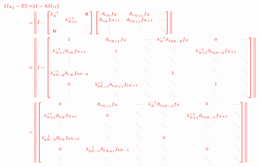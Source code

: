 \documentclass[11pt,a4paper,titlepage]{jsreport}
\theoremstyle{definition}
\providecommand{\DIFdel}[1]{{\protect\color{red} \scriptsize #1}} %
\begin{document}
\begin{enumerate}
\begin{displaymath}
  \DIFdel{\scriptsize
  \begin{split}
    \|I_{X_2} - E \| =& \| I - \Lambda M_{11}\| \\
    =& \left\| I -
    \begin{bmatrix}
      \lambda^{-1}_N & & \mathbf{0} \\
      & \lambda^{-1}_{N+1} &\\
      \mathbf{0} &  & \ddots
    \end{bmatrix}
    \begin{bmatrix}
      \partial_{a_{N}} f_{N} & \partial_{a_{N+1}} f_{N}  & \cdots \\
      \partial_{a_{N}} f_{N+1} & \partial_{a_{N+1}} f_{N+1}  & \cdots \\
      \vdots & \vdots & \ddots \\
    \end{bmatrix}
    \right\|\\
    =& \left \|
    I - \begin{bmatrix}
      1 & \partial_{a_{N+1}} f_{N}  & \cdots & \lambda^{-1}_{N}\partial_{a_{3N-2}}f_N & 0 & \cdots \\
      \lambda^{-1}_{N+1}\partial_{a_{N}} f_{N+1} & 1  & \ddots & \ddots & \lambda^{-1}_{N+1}\partial_{a_{3N-3}}f_{N+1} & \ddots \\
      \vdots & \ddots & \ddots & \ddots & \ddots & \ddots \\
      \lambda^{-1}_{3N-2}\partial_{a_{N}} f_{3N-2} & \ddots & \ddots & 1 & \ddots & \ddots\\
      0 & \lambda^{-1}_{3N-1}\partial_{a_{N+1}} f_{3N-1}& \ddots & \ddots & 1 & \ddots\\
      \vdots & \ddots & \ddots & \ddots & \ddots & \ddots\\
    \end{bmatrix}
    \right \|\\
    =&\left\|
    \begin{bmatrix}
      0 & \partial_{a_{N+1}} f_{N}  & \cdots & \lambda^{-1}_{N}\partial_{a_{3N-2}}f_N & 0 & \cdots \\
      \lambda^{-1}_{N+1}\partial_{a_{N}} f_{N+1} & 0  & \ddots & \ddots & \lambda^{-1}_{N+1}\partial_{a_{3N-3}}f_{N+1} & \ddots \\
      \vdots & \ddots & \ddots & \ddots & \ddots & \ddots \\
      \lambda^{-1}_{3N-2}\partial_{a_{N}} f_{3N-2} & \ddots & \ddots & 0 & \ddots & \ddots\\
      0 & \lambda^{-1}_{3N-1}\partial_{a_{N+1}} f_{3N-1}& \ddots & \ddots & 0 & \ddots\\
      \vdots & \ddots & \ddots & \ddots & \ddots & \ddots\\
    \end{bmatrix}
    \right \|
  \end{split}
}\end{displaymath}%


\end{enumerate}
\end{document}
